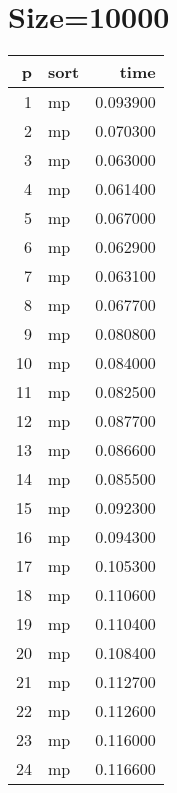\documentclass{article}%
\begin{document}
%
\normalsize%
\section{Size=10000}%
\label{sec:Size=10000}%
\begin{tabular}{rlr}
\toprule
p & sort & time \\
\midrule
1 & mp & 0.093900 \\
2 & mp & 0.070300 \\
3 & mp & 0.063000 \\
4 & mp & 0.061400 \\
5 & mp & 0.067000 \\
6 & mp & 0.062900 \\
7 & mp & 0.063100 \\
8 & mp & 0.067700 \\
9 & mp & 0.080800 \\
10 & mp & 0.084000 \\
11 & mp & 0.082500 \\
12 & mp & 0.087700 \\
13 & mp & 0.086600 \\
14 & mp & 0.085500 \\
15 & mp & 0.092300 \\
16 & mp & 0.094300 \\
17 & mp & 0.105300 \\
18 & mp & 0.110600 \\
19 & mp & 0.110400 \\
20 & mp & 0.108400 \\
21 & mp & 0.112700 \\
22 & mp & 0.112600 \\
23 & mp & 0.116000 \\
24 & mp & 0.116600 \\
\bottomrule
\end{tabular}

%
\end{document}
